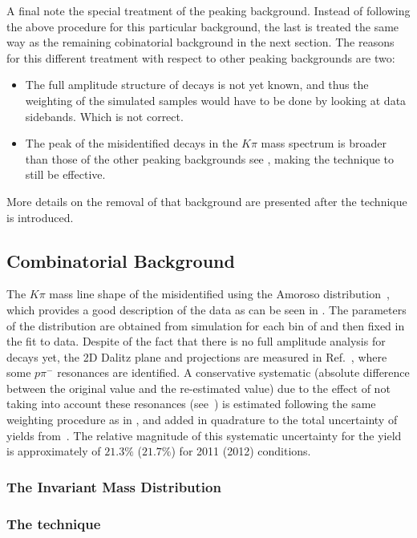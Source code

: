 A final note the special treatment of the \LbJpsippi peaking background. Instead of following the above procedure for this
particular background, the last is treated the same way as the remaining cobinatorial background in the next section.
The reasons for this different treatment with respect to other peaking backgrounds are two:
\begin{itemize}
\item The full amplitude structure of \LbJpsippi decays is not yet known, and thus the weighting of the simulated samples 
      would have to be done by looking at data sidebands. Which is not correct.
\item The peak of the misidentified \LbJpsippi decays in the \Jpsi$K\pi$ mass spectrum is broader than those of the other
      peaking backgrounds see , making the \sPlot technique to still be effective.  
\end{itemize}
More details on the removal of that background are presented after the \sPlot technique is introduced.

\subsection{Combinatorial Background}
\label{Combinatorial_Background}

\noindent The \Jpsi$K\pi$ mass line shape of the misidentified \LbJpsippi using the Amoroso distribution~\cite{Amoroso}, which provides a good description of the data as can be seen in . 
The parameters of the distribution are obtained from simulation for each bin of \mkpi and then fixed in the fit to data. Despite
of the fact that there is no full amplitude analysis for \LbJpsippi decays yet, the 2D Dalitz plane and projections are
measured in Ref.~\cite{LHCb-PAPER-2014-020}, where some $p\pi^-$ resonances are identified. A conservative systematic (absolute
difference between the original value and the re-estimated value) due to the effect of not taking into account these resonances
(see~) is estimated following the same weighting procedure as in , and
added in quadrature to the total uncertainty of \LbJpsippi yields from~. The relative magnitude of
this
systematic uncertainty for the \LbJpsippi yield is approximately of $21.3\%$ ($21.7\%$) for 2011 (2012) conditions.

\subsubsection{The \BJpsiKpi Invariant Mass Distribution}

\subsubsection{The \sPlot technique}


